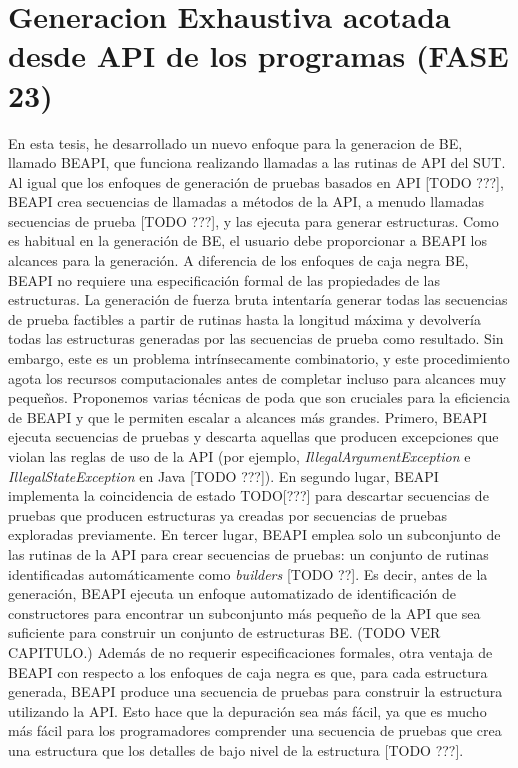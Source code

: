\chapter[Generacion Exhaustiva acotada desde API de los programas (FASE 23)]{Generacion Exhaustiva acotada desde API de los programas (FASE 23)}
\label{cap:beapi}

En esta tesis, he desarrollado un nuevo enfoque para la generacion de BE, llamado \textsf{BEAPI}, que funciona realizando llamadas a las rutinas de API del SUT. Al igual que los enfoques de generación de pruebas basados en API [TODO ???], \textsf{BEAPI} crea secuencias de llamadas a métodos de la API, a menudo llamadas secuencias de prueba [TODO ???], y las ejecuta para generar estructuras. Como es habitual en la generación de BE, el usuario debe proporcionar a \textsf{BEAPI} los alcances para la generación. A diferencia de los enfoques de caja negra BE, \textsf{BEAPI} no requiere una especificación formal de las propiedades de las estructuras. La generación de fuerza bruta intentaría generar todas las secuencias de prueba factibles a partir de rutinas hasta la longitud máxima y devolvería todas las estructuras generadas por las secuencias de prueba como resultado. Sin embargo, este es un problema intrínsecamente combinatorio, y este procedimiento agota los recursos computacionales antes de completar incluso para alcances muy pequeños. Proponemos varias técnicas de poda que son cruciales para la eficiencia de \textsf{BEAPI} y que le permiten escalar a alcances más grandes. Primero, \textsf{BEAPI} ejecuta secuencias de pruebas y descarta aquellas que producen excepciones que violan las reglas de uso de la API (por ejemplo, \emph{IllegalArgumentException} e \emph{IllegalStateException} en Java [TODO ???]). En segundo lugar, \textsf{BEAPI} implementa la coincidencia de estado TODO[???] para descartar secuencias de pruebas que producen estructuras ya creadas por secuencias de pruebas exploradas previamente. En tercer lugar, \textsf{BEAPI} emplea solo un subconjunto de las rutinas de la API para crear secuencias de pruebas: un conjunto de rutinas identificadas automáticamente como \emph{builders} [TODO ??]. Es decir, antes de la generación, \textsf{BEAPI} ejecuta un enfoque automatizado de identificación de constructores para encontrar un subconjunto más pequeño de la API que sea suficiente para construir un conjunto de estructuras BE. (TODO VER CAPITULO.)
Además de no requerir especificaciones formales, otra ventaja de \textsf{BEAPI} con respecto a los enfoques de caja negra es que, para cada estructura generada, \textsf{BEAPI} produce una secuencia de pruebas para construir la estructura utilizando la API. Esto hace que la depuración sea más fácil, ya que es mucho más fácil para los programadores comprender una secuencia de pruebas que crea una estructura que los detalles de bajo nivel de la estructura [TODO ???].

